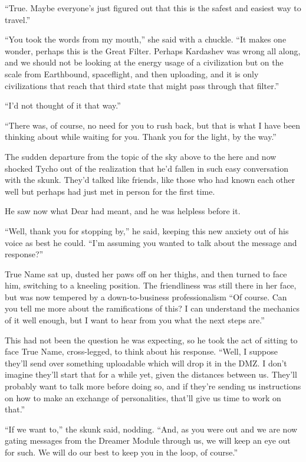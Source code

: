 ``True. Maybe everyone's just figured out that this is the safest and easiest way to travel.''

``You took the words from my mouth,'' she said with a chuckle. ``It makes one wonder, perhaps this is the Great Filter. Perhaps Kardashev was wrong all along, and we should not be looking at the energy usage of a civilization but on the scale from Earthbound, spaceflight, and then uploading, and it is only civilizations that reach that third state that might pass through that filter.''

``I'd not thought of it that way.''

``There was, of course, no need for you to rush back, but that is what I have been thinking about while waiting for you. Thank you for the light, by the way.''

The sudden departure from the topic of the sky above to the here and now shocked Tycho out of the realization that he'd fallen in such easy conversation with the skunk. They'd talked like friends, like those who had known each other well but perhaps had just met in person for the first time.

He saw now what Dear had meant, and he was helpless before it.

``Well, thank you for stopping by,'' he said, keeping this new anxiety out of his voice as best he could. ``I'm assuming you wanted to talk about the message and response?''

True Name sat up, dusted her paws off on her thighs, and then turned to face him, switching to a kneeling position. The friendliness was still there in her face, but was now tempered by a down-to-business professionalism ``Of course. Can you tell me more about the ramifications of this? I can understand the mechanics of it well enough, but I want to hear from you what the next steps are.''

This had not been the question he was expecting, so he took the act of sitting to face True Name, cross-legged, to think about his response. ``Well, I suppose they'll send over something uploadable which will drop it in the DMZ. I don't imagine they'll start that for a while yet, given the distances between us. They'll probably want to talk more before doing so, and if they're sending us instructions on how to make an exchange of personalities, that'll give us time to work on that.''

``If we want to,'' the skunk said, nodding. ``And, as you were out and we are now gating messages from the Dreamer Module through us, we will keep an eye out for such. We will do our best to keep you in the loop, of course.''

